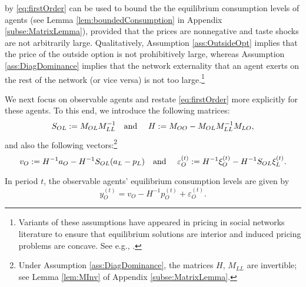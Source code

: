 \documentclass[opre,nonblindrev]{informs3} %
\begin{document}
by \eqref{eq:firstOrder} can be used to bound the
  the equilibrium consumption levels of agents  (see Lemma \ref{lem:boundedConsumption} in Appendix \ref{subse:MatrixLemma}),
provided that the prices are nonnegative and taste shocks are not arbitrarily large.
Qualitatively, Assumption \ref{ass:OutsideOpt} implies that the price of the outside option is not prohibitively large, whereas Assumption \ref{ass:DiagDominance} implies that the network externality
that an agent exerts on the rest of the network (or vice versa) is not too large.\footnote{Variants of these assumptions have appeared in pricing in social networks literature to ensure that equilibrium solutions are interior and induced pricing problems are concave. See e.g., 	\cite{ballester2006s,candogan2012optimal,fainmesser2015pricing,zhou2015key}.}




We next focus
 on observable agents
and restate
\eqref{eq:firstOrder} more explicitly for these agents.
To this end, we introduce the following matrices:
\begin{equation}
\begin{aligned}
S_{OL}:=  M_{OL}M_{LL}^{-1} \mbox{\quad and \quad}
H:= M_{OO}-M_{OL}M_{LL}^{-1}M_{LO},
\end{aligned}
\end{equation}
and also the following vectors:\footnote{Under Assumption \ref{ass:DiagDominance}, the matrices $H$, $M_{LL}$ are invertible; see Lemma \ref{lem:MInv} of Appendix \ref{subse:MatrixLemma}.}
\begin{equation}\label{eq:defVo}
{v}_O := H^{-1}  {a}_O-H^{-1} S_{OL} ( {a}_L - {p}_L) \mbox{\quad and \quad}
\varepsilon_O^{(t)} := H^{-1} \xi_O^{(t)}-H^{-1} S_{OL}  {\xi}^{(t)}_L.
\end{equation}





  \begin{lemma} \label{lem:firstOrderO}
 In period $t$, the observable
    agents' equilibrium consumption levels are given by
  	\begin{equation}\label{eq:def:noise1}
{y}_O^{(t)}
  	 =  {v}_O-H^{-1} {p}_O^{(t)} +\varepsilon_O^{(t)}.
  	\end{equation}
  	\end{lemma}
\end{document}
